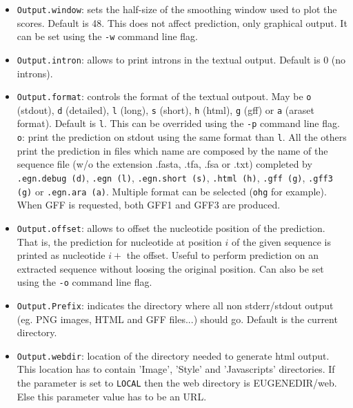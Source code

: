 \documentclass[a4paper,titlepage]{report}
\begin{document}
\begin{itemize}
\item \texttt{Output.window}: sets the half-size of the smoothing
  window used to plot the scores.  Default is 48. This does not affect
  prediction, only graphical output. It can be set using the
  \texttt{-w} command line flag. 

\item \texttt{Output.intron}: allows to print introns in the textual output.
  Default is 0 (no introns).
 
\item \texttt{Output.format}: controls the format of the textual
  outpout. May be \texttt{o} (stdout), \texttt{d} (detailed),
  \texttt{l} (long), \texttt{s} (short), \texttt{h} (html), \texttt{g}
  (gff) or \texttt{a} (araset format). Default is \texttt{l}. This can
  be overrided using the \texttt{-p} command line
  flag. \texttt{o}:
  print the prediction on stdout using the same format than
  \texttt{l}.  All the others print the prediction in files which name
  are composed by the name of the sequence file (w/o the extension
  .fasta, .tfa, .fsa or .txt) completed by \texttt{.egn.debug (d)},
  \texttt{.egn (l)}, \texttt{.egn.short (s)}, \texttt{.html (h)},
  \texttt{.gff (g)}, \texttt{.gff3 (g)} or \texttt{.egn.ara (a)}.
  Multiple format can be selected (\texttt{ohg} for example). When GFF
  is requested, both GFF1 and GFF3 are produced.
  
\item \texttt{Output.offset}: allows to offset the nucleotide position
  of the prediction.  That is, the prediction for nucleotide at
  position $i$ of the given sequence is printed as nucleotide $i+$ the
  offset. Useful to perform prediction on an extracted sequence
  without loosing the original position. Can also be set using the
  \texttt{-o} command line flag. 
  
\item \texttt{Output.Prefix}: indicates the directory where all non
  stderr/stdout output (eg. PNG images, HTML and GFF files...) should go.
  Default is the current directory.

\item \texttt{Output.webdir}: location of the directory needed to generate html output. 
This location has to contain 'Image', 'Style' and 'Javascripts' directories.
If the parameter is set to \texttt{LOCAL} then the web directory is EUGENEDIR/web. 
Else this parameter value has to be an URL.


\end{itemize}
\end{document}
